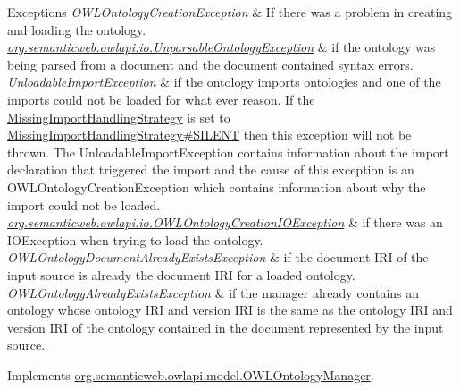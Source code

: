 \begin{DoxyExceptions}{Exceptions}
{\em O\-W\-L\-Ontology\-Creation\-Exception} & If there was a problem in creating and loading the ontology. \\
\hline
{\em \hyperlink{classorg_1_1semanticweb_1_1owlapi_1_1io_1_1_unparsable_ontology_exception}{org.\-semanticweb.\-owlapi.\-io.\-Unparsable\-Ontology\-Exception}} & if the ontology was being parsed from a document and the document contained syntax errors. \\
\hline
{\em Unloadable\-Import\-Exception} & if the ontology imports ontologies and one of the imports could not be loaded for what ever reason. If the \hyperlink{}{Missing\-Import\-Handling\-Strategy} is set to \hyperlink{enumorg_1_1semanticweb_1_1owlapi_1_1model_1_1_missing_import_handling_strategy_aed66060ec95dc4ad59ca4dd82509782b}{Missing\-Import\-Handling\-Strategy\#\-S\-I\-L\-E\-N\-T} then this exception will not be thrown. The {\ttfamily Unloadable\-Import\-Exception} contains information about the import declaration that triggered the import and the cause of this exception is an {\ttfamily O\-W\-L\-Ontology\-Creation\-Exception} which contains information about why the import could not be loaded. \\
\hline
{\em \hyperlink{classorg_1_1semanticweb_1_1owlapi_1_1io_1_1_o_w_l_ontology_creation_i_o_exception}{org.\-semanticweb.\-owlapi.\-io.\-O\-W\-L\-Ontology\-Creation\-I\-O\-Exception}} & if there was an {\ttfamily I\-O\-Exception} when trying to load the ontology. \\
\hline
{\em O\-W\-L\-Ontology\-Document\-Already\-Exists\-Exception} & if the document I\-R\-I of the input source is already the document I\-R\-I for a loaded ontology. \\
\hline
{\em O\-W\-L\-Ontology\-Already\-Exists\-Exception} & if the manager already contains an ontology whose ontology I\-R\-I and version I\-R\-I is the same as the ontology I\-R\-I and version I\-R\-I of the ontology contained in the document represented by the input source. \\
\hline
\end{DoxyExceptions}


Implements \hyperlink{interfaceorg_1_1semanticweb_1_1owlapi_1_1model_1_1_o_w_l_ontology_manager_a2591cdaf647b45bd68de3b6ad73727c3}{org.\-semanticweb.\-owlapi.\-model.\-O\-W\-L\-Ontology\-Manager}.

